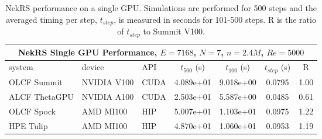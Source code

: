  \begin{table*}[!h]
  \footnotesize
  \begin{center}
  \begin{tabular}{|l|l|l|c|c|c|c|}
  \hline
  \multicolumn{7}{|c|}{{\bf NekRS Single GPU Performance, $E=7168$, $N=7$, $n=2.4M$, $Re=5000$}} \\
  \hline
   system   & device &   API &  $t_{500}$ (s)    &   $t_{100}$  (s)  &   $t_{step}$ (s) & R \\
  \hline
    OLCF Summit   & NVIDIA V100  &  CUDA   &    4.089e+01  &  9.018e+00 &  0.0795 & 1.00   \\
    ALCF ThetaGPU & NVIDIA A100  &  CUDA   &    2.503e+01  &  5.587e+00 &  0.0485 & 0.61   \\
    OLCF Spock    & AMD MI100    &  HIP    &    5.007e+01  &  1.103e+01 &  0.0975 & 1.22   \\
    HPE Tulip     & AMD MI100    &  HIP    &    4.870e+01  &  1.060e+01 &  0.0953 & 1.19   \\
  \hline
  \end{tabular}
  \end{center}
  \caption{\label{singlerod} NekRS performance on a single GPU.
   Simulations are performed for 500 steps and the averaged timing per step, $t_{step}$,
   is measured in seconds for 101-500 steps. R is the ratio of $t_{step}$ to Summit V100.
   }
 \end{table*}

